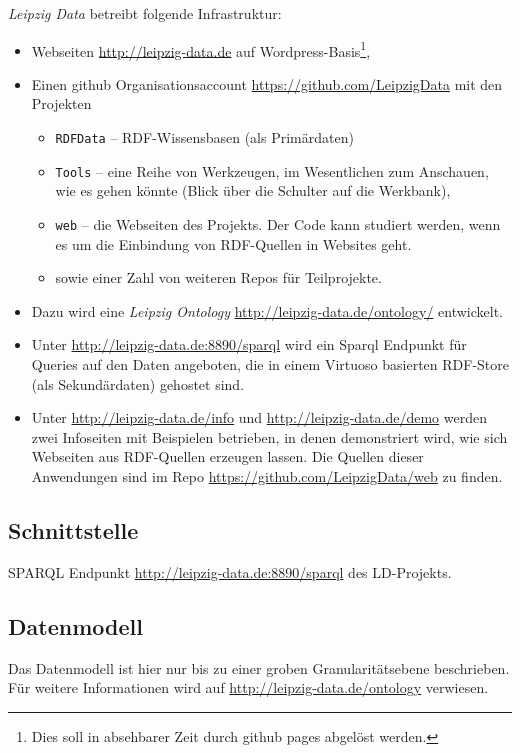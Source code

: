 \documentclass[a4paper,11pt]{article}
\begin{document}
\emph{Leipzig Data} betreibt folgende Infrastruktur:
\begin{itemize}
\item Webseiten \url{http://leipzig-data.de} auf Wordpress-Basis\footnote{Dies
  soll in absehbarer Zeit durch github pages abgelöst werden.},
\item Einen github Organisationsaccount \url{https://github.com/LeipzigData}
  mit den Projekten
  \begin{itemize}
  \item \texttt{RDFData} – RDF-Wissensbasen (als Primärdaten)
  \item \texttt{Tools} – eine Reihe von Werkzeugen, im Wesentlichen zum
    Anschauen, wie es gehen könnte (Blick über die Schulter auf die Werkbank), 
  \item \texttt{web} – die Webseiten des Projekts. Der Code kann studiert
    werden, wenn es um die Einbindung von RDF-Quellen in Websites geht.
  \item sowie einer Zahl von weiteren Repos für Teilprojekte.
  \end{itemize}
\item Dazu wird eine \emph{Leipzig Ontology}
  \url{http://leipzig-data.de/ontology/} entwickelt.
\item Unter \url{http://leipzig-data.de:8890/sparql} wird ein Sparql Endpunkt
  für Queries auf den Daten angeboten, die in einem Virtuoso basierten
  RDF-Store (als Sekundärdaten) gehostet sind.
\item Unter \url{http://leipzig-data.de/info} und
  \url{http://leipzig-data.de/demo} werden zwei Infoseiten mit Beispielen
  betrieben, in denen demonstriert wird, wie sich Webseiten aus RDF-Quellen
  erzeugen lassen.  Die Quellen dieser Anwendungen sind im Repo
  \url{https://github.com/LeipzigData/web} zu finden.
\end{itemize}

\subsection{Schnittstelle}

SPARQL Endpunkt \url{http://leipzig-data.de:8890/sparql} des LD-Projekts.

\subsection{Datenmodell}

Das Datenmodell ist hier nur bis zu einer groben Granularitätsebene
beschrieben.  Für weitere Informationen wird auf
\url{http://leipzig-data.de/ontology} verwiesen.
\end{document}
